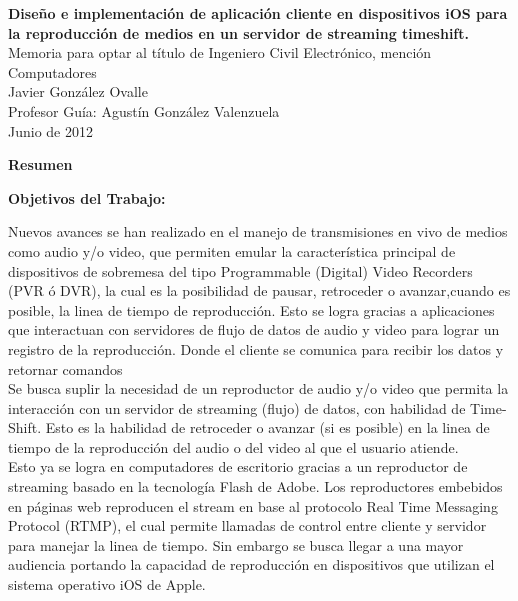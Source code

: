 \newpage
\thispagestyle{empty}
\begin{center}
 \Large \textbf{Diseño e implementación de aplicación cliente en dispositivos iOS para la reproducción de medios en un servidor de streaming timeshift.}\\

\normalsize Memoria para optar al título de Ingeniero Civil Electrónico, mención Computadores \\
\normalsize Javier González Ovalle \\
\normalsize Profesor Guía: Agustín González Valenzuela \\
\normalsize Junio de 2012

\Large \textbf{Resumen}

\end{center}
\normalsize
\textbf{Objetivos del Trabajo:} \\

\normalsize

Nuevos avances se han realizado en el manejo de transmisiones en vivo de medios como audio y/o video, que permiten emular la característica principal de dispositivos de sobremesa del tipo Programmable (Digital) Video Recorders (PVR ó DVR), la cual es la posibilidad de pausar, retroceder o avanzar,cuando es posible, la linea de tiempo de reproducción. Esto se logra gracias a aplicaciones que interactuan con servidores de flujo de datos de audio y video para lograr un registro de la reproducción. Donde el cliente se comunica para recibir los datos y retornar comandos\\ 

Se busca suplir la necesidad de un reproductor de audio y/o video que permita la interacci\'on con un servidor de streaming (flujo) de datos, con habilidad de Time-Shift. Esto es la habilidad de retroceder o avanzar (si es posible) en la linea de tiempo de la reproducci\'on del audio o del video al que el usuario atiende.\\

Esto ya se logra en computadores de escritorio gracias a un reproductor de streaming basado en la tecnolog\'ia Flash de Adobe. Los reproductores embebidos en p\'aginas web reproducen el stream en base al protocolo Real Time Messaging Protocol (RTMP), el cual permite llamadas de control entre cliente y servidor para manejar la linea de tiempo. Sin embargo se busca llegar a una mayor audiencia portando la capacidad de reproducci\'on en dispositivos que utilizan el sistema operativo iOS de Apple.\\

